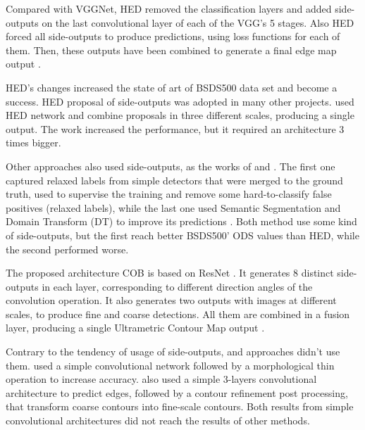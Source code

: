 Compared with VGGNet, HED removed the classification layers and added side-outputs on the last convolutional layer of each of the VGG's 5 stages.
Also HED forced all side-outputs to produce predictions, using loss functions for each of them.
Then, these outputs have been combined to generate a final edge map output \cite{HED:2015}.

HED's changes increased the state of art of BSDS500 data set \cite{amfm_pami2011} and become a success.
HED proposal of side-outputs was adopted in many other projects.
\cite{Kokkinos:2016} used HED network and combine proposals in three different scales, producing a single output.
The work increased the performance, but it required an architecture 3 times bigger.

Other approaches also used side-outputs, as the works of \cite{LearningRelaxed:2016:7780401} and \cite{SemanticSeg:2016:7780861}.
The first one captured relaxed labels from simple detectors that were merged to the ground truth, used to supervise the training and remove some hard-to-classify false positives (relaxed labels), while the last one used Semantic Segmentation and Domain Transform (DT) to improve its predictions \cite{LearningRelaxed:2016:7780401} \cite{SemanticSeg:2016:7780861}.
Both method use some kind of side-outputs, but the first reach better BSDS500' ODS values than HED, while the second performed worse.

The proposed architecture COB is based on ResNet \cite{RESNET:2016:7780459}.
It generates 8 distinct side-outputs in each layer, corresponding to different direction angles of the convolution operation.
It also generates two outputs with images at different scales, to produce fine and coarse detections.
All them are combined in a fusion layer, producing a single Ultrametric Contour Map output \cite{COB:2018:7917294}.

Contrary to the tendency of usage of side-outputs, \cite{EdgeCNN:Wang201612} and \cite{ContourDetect:2017:8124495} approaches didn't use them.
\cite{EdgeCNN:Wang201612} used a simple convolutional network followed by a morphological thin operation to increase accuracy.
\cite{ContourDetect:2017:8124495} also used a simple 3-layers convolutional architecture to predict edges, followed by a contour refinement post processing, that transform coarse contours into fine-scale contours.
Both results from simple convolutional architectures did not reach the results of other methods. %

